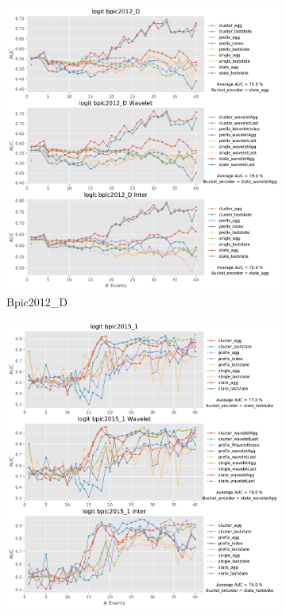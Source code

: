 \documentclass[twoside,11pt]{Latex/Classes/PhDthesisPSnPDF}
\begin{document}
\begin{figure}[!htbp] %
	
	\begin{subfigure}{0.48\textwidth}
		\includegraphics[width=\linewidth]{images/inter/logit/bpic2012_D.pdf}
		\caption{Bpic2012\_D} \label{fig:b12di}
	\end{subfigure}\hspace*{\fill}
	\begin{subfigure}{0.48\textwidth}
		\includegraphics[width=\linewidth]{images/inter/logit/bpic2015_1.pdf}

\end{subfigure}
\end{figure}
\end{document}
